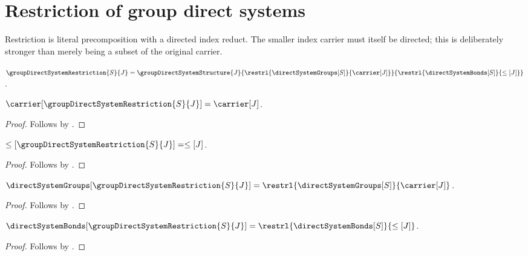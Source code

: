 

\section{Restriction of group direct systems}

Restriction is literal precomposition with a directed index reduct.  The
smaller index carrier must itself be directed; this is deliberately stronger
than merely being a subset of the original carrier.

\begin{definition}\label{group_direct_system_restriction}
    $\groupDirectSystemRestriction{S}{J}=
        \groupDirectSystemStructure
            {J}
            {\restrl{\directSystemGroups[S]}{\carrier[J]}}
            {\restrl{\directSystemBonds[S]}{\leq[J]}}$.
\end{definition}

\begin{proposition}\label{group_direct_system_restriction_carrier}
    $\carrier[\groupDirectSystemRestriction{S}{J}]=\carrier[J]$.
\end{proposition}
\begin{proof}
    Follows by
        .
\end{proof}

\begin{proposition}\label{group_direct_system_restriction_order}
    $\leq[\groupDirectSystemRestriction{S}{J}]=\leq[J]$.
\end{proposition}
\begin{proof}
    Follows by
        .
\end{proof}

\begin{proposition}\label{group_direct_system_restriction_groups}
    $\directSystemGroups[\groupDirectSystemRestriction{S}{J}]
        =\restrl{\directSystemGroups[S]}{\carrier[J]}$.
\end{proposition}
\begin{proof}
    Follows by
        .
\end{proof}

\begin{proposition}\label{group_direct_system_restriction_bonds}
    $\directSystemBonds[\groupDirectSystemRestriction{S}{J}]
        =\restrl{\directSystemBonds[S]}{\leq[J]}$.
\end{proposition}
\begin{proof}
    Follows by
        .
\end{proof}

